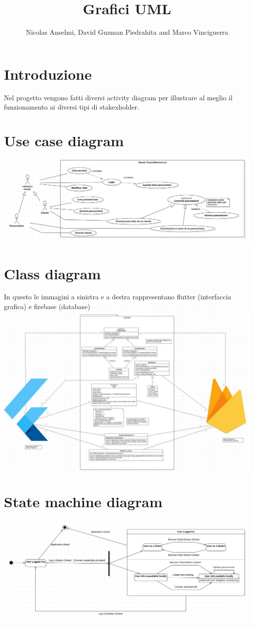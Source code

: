 \documentclass{article}
\title{Grafici UML}
\author{Nicolas Anselmi, David Guzman Piedrahita and Marco Vinciguerra}
\begin{document}
\maketitle        
\section{Introduzione}
Nel progetto vengono fatti diversi activity diagram per illustrare al
meglio il funzionamento ai diversi tipi di stakexholder.
 
\section{Use case diagram}
\includegraphics[scale = 0.45]{ImmaginiUML/UseCase.png}
\section{Class diagram}
In questo le immagini a sinistra e a destra rappresentano flutter (interfaccia grafica) 
e firebase (database)
\\\includegraphics[scale = 0.4]{ImmaginiUML/ClassDiagram.jpg}
\newpage
\section{State machine diagram}
\includegraphics[scale = 0.5]{ImmaginiUML/StateMachineDiagram.png}
\newpage
\end{document}
